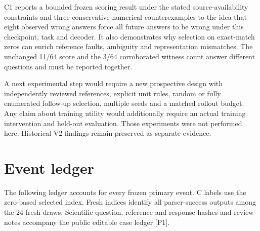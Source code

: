 \documentclass[11pt,a4paper]{article}
\begin{document}
C1 reports a bounded frozen scoring result under the stated
source-availability constraints and three conservative numerical
counterexamples to the idea that eight observed wrong answers force all
future answers to be wrong under this checkpoint, task and decoder. It
also demonstrates why selection on exact-match zeros can enrich
reference faults, ambiguity and representation mismatches. The unchanged
11/64 score and the 3/64 corroborated witness count answer different
questions and must be reported together.

A next experimental step would require a new prospective design with
independently reviewed references, explicit unit rules, random or fully
enumerated follow-up selection, multiple seeds and a matched rollout
budget. Any claim about training utility would additionally require an
actual training intervention and held-out evaluation. Those experiments
were not performed here. Historical V2 findings remain preserved as
separate evidence.

\clearpage

\section{Event ledger}\label{event-ledger}

The following ledger accounts for every frozen primary event. C labels
use the zero-based selected index. Fresh indices identify all
parser-success outputs among the 24 fresh draws. Scientific question,
reference and response hashes and review notes accompany the public
editable case ledger {[}P1{]}.
\end{document}

